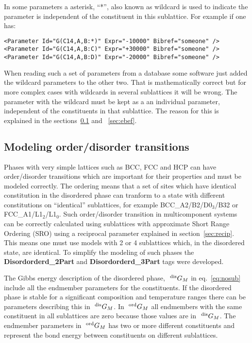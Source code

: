\documentclass{article}
\begin{document}
\begin{appendices}
In some parameters a asterisk, ``*'', also known as wildcard is used
to indicate the parameter is independent of the constituent in this
sublattice.  For example if one has:

\begin{verbatim}
<Parameter Id="G(C14,A,B:*)" Expr="-10000" Bibref="someone" />
<Parameter Id="G(C14,A,B:C)" Expr="+30000" Bibref="someone" />
<Parameter Id="G(C14,A,B:D)" Expr="-20000" Bibref="someone" />
\end{verbatim}

When reading such a set of parameters from a database some software
just added the wildcard parameters to the other two.  That is
mathematically correct but for more complex cases with wildcards in
several sublattices it will be wrong.  The parameter with the wildcard
must be kept as a an individual parameter, independent of the
constituents in that sublattice.  The reason for this is explained in
the sections~\ref{sec:OD} and ~\ref{sec:ebef}.

\subsection{Modeling order/disorder transitions}\label{sec:OD}

Phases with very simple lattices such as BCC, FCC and HCP can have
order/disorder transitions which are important for their properties
and must be modeled correctly.  The ordering means that a set of sites
which have identical constitution in the disordered phase can tranform
to a state with different constitutions on ``identical'' sublattices,
for example BCC\_A2/B2/D0$_3$/B32 or FCC\_A1/L1$_2$/L1$_0$.  Such
order/disorder transition in multicomponent systems can be correctly
calculated using sublattices with approximate Short Range Ordering
(SRO) using a reciprocal parameter explained in
section~\ref{sec:recip}.  This means one must use models with 2 or 4
sublattices which, in the disordered state, are identical.  To
simplify the modeling of such phases the {\bf Disordorderd\_2Part} and
{\bf Disordorderd\_3Part} tags were developed.

The Gibbs energy description of the disordered phase, $~^{\rm dis}G_M$
in eq.~\ref{eq:nosub} include all the endmember parameters for the
constituents.  If the disordered phase is stable for a significant
composition and temperature ranges there can be parameters describing
this in $~^{\rm dis}G_M$.  In $~^{\rm ord}G_M$ all endmembers with the
same constituent in all sublattices are zero because those values are
in $~^{\rm dis}G_M$.  The endmember parameters in $~^{\rm ord}G_M$ has
two or more different constituents and represent the bond energy
between constituents on different sublattices.


\end{appendices}
\end{document}
